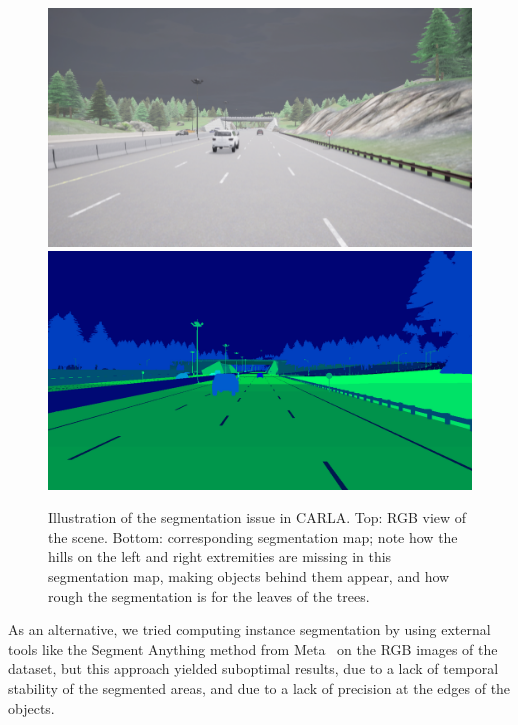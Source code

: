 \begin{figure}
  \centering
  \includegraphics[width=0.9\linewidth]{mainmatter/figures/a_additional_exp/carla/segmentation_rgb.png}
  \includegraphics[width=0.9\linewidth]{mainmatter/figures/a_additional_exp/carla/segmentation_map.png}
  \caption{Illustration of the segmentation issue in CARLA. Top: RGB view of the scene. Bottom: corresponding segmentation map; note how the hills on the left and right extremities are missing in this segmentation map, making objects behind them appear, and how rough the segmentation is for the leaves of the trees.}\label{fig:appendix:carla:segmentation}
\end{figure}

As an alternative, we tried computing instance segmentation by using external tools like the Segment Anything method from Meta~\cite{Kirillov2023SegmentA} on the RGB images of the dataset, but this approach yielded suboptimal results, due to a lack of temporal stability of the segmented areas, and due to a lack of precision at the edges of the objects.

